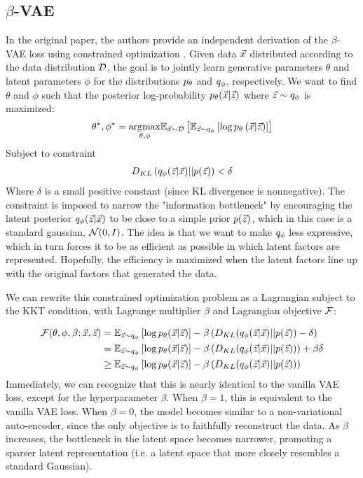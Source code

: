 \subsection{$\beta$-VAE}

In the original paper, the authors provide an independent derivation of the $\beta$-VAE loss using constrained optimization \cite{higgins2016beta}. Given data $\vec{x}$ distributed according to the data distribution $\mathcal{D}$, the goal is to jointly learn generative parameters $\theta$ and latent parameters $\phi$ for the distributions $p_\theta$ and $q_\phi$, respectively. We want to find $\theta$ and $\phi$ such that the posterior log-probability $p_\theta(\vec{x}|\vec{z})$ where $\vec{z}\sim q_\phi$ is maximized:
\begin{align*}
    \theta^*,\phi^* = \underset{\theta,\phi}{\operatorname{argmax}}\mathbb{E}_{\vec{x}\sim\mathcal{D}}\left[ \mathbb{E}_{\vec{z}\sim q_\phi}\left[ \log p_\theta\left( \vec{x}|\vec{z} \right) \right] \right]
\end{align*}
Subject to constraint
\begin{align*}
    D_{KL}\left( q_\phi(\vec{z}|\vec{x})||p(\vec{z}) \right) < \delta
\end{align*}
Where $\delta$ is a small positive constant (since KL divergence is nonnegative). The constraint is imposed to narrow the "information bottleneck" by encouraging the latent posterior $q_\phi(\vec{z}|\vec{x})$ to be close to a simple prior $p(\vec{z})$, which in this case is a standard gaussian, $\mathcal{N}(0, I)$. The idea is that we want to make $q_\phi$ less expressive, which in turn forces it to be as efficient as possible in which latent factors are represented. Hopefully, the efficiency is maximized when the latent factors line up with the original factors that generated the data.

We can rewrite this constrained optimization problem as a Lagrangian subject to the KKT condition, with Lagrange multiplier $\beta$ and Lagrangian objective $\mathcal{F}$:

\begin{align*}
    \mathcal{F}(\theta, \phi, \beta; \vec{x}, \vec{z}) &= \mathbb{E}_{\vec{z}\sim q_\phi}\left[ \log p_\theta(\vec{x}|\vec{z}) \right] - \beta\left( D_{KL}(q_\phi(\vec{z}|\vec{x})||p(\vec{z})) - \delta \right) \\
    &= \mathbb{E}_{\vec{z}\sim q_\phi}\left[ \log p_\theta(\vec{x}|\vec{z}) \right] - \beta\left( D_{KL}(q_\phi(\vec{z}|\vec{x})||p(\vec{z}))\right) + \beta\delta \\
    &\geq \mathbb{E}_{\vec{z}\sim q_\phi}\left[ \log p_\theta(\vec{x}|\vec{z}) \right] - \beta\left( D_{KL}(q_\phi(\vec{z}|\vec{x})||p(\vec{z}))\right)
\end{align*}
Immediately, we can recognize that this is nearly identical to the vanilla VAE loss, except for the hyperparameter $\beta$. When $\beta=1$, this is equivalent to the vanilla VAE loss. When $\beta = 0$, the model becomes similar to a non-variational auto-encoder, since the only objective is to faithfully reconstruct the data. As $\beta$ increases, the bottleneck in the latent space becomes narrower, promoting a sparser latent representation (i.e. a latent space that more closely resembles a standard Gaussian).

